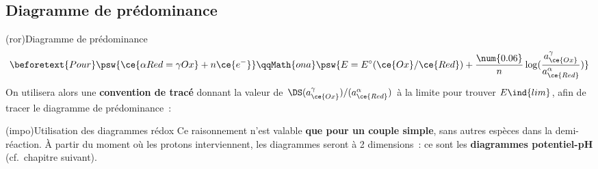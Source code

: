 \documentclass[../../main/main.tex]{subfiles}
\begin{document}
\subsection{Diagramme de prédominance}
\begin{tcb*}(ror){Diagramme de prédominance}
	\vspace{-10pt}
	\begin{gather*}
		\beforetext{Pour}
		\psw{
			\ce{\alpha Red = \gamma Ox} + n\ce{e^-}
		}
		\qqMath{on a}
		\psw{
			E = E^\circ(\ce{Ox}/\ce{Red}) + \frac{\num{0.06}}{n} \log
			(\frac{a_{\ce{Ox}}^{\gamma}}{a_{\ce{Red}}^{\alpha}})
		}
	\end{gather*}
	On utilisera alors une \textbf{convention de tracé} donnant la valeur de
	$\DS (a_{\ce{Ox}}^{\gamma})/(a_{\ce{Red}}^{\alpha})$ à la limite pour
	trouver $E\ind{lim}$, afin de tracer le diagramme de prédominance~:
	\vspace{-15pt}
	\begin{center}
		\vspace{-15pt}
	\end{center}
\end{tcb*}
\begin{tcb*}(impo){Utilisation des diagrammes rédox}
	Ce raisonnement n'est valable \textbf{que pour un couple simple}, sans autres
	espèces dans la demi-réaction. À partir du moment où les protons 
	interviennent, les diagrammes seront à 2 dimensions~: ce sont les
	\textbf{diagrammes potentiel-pH} (cf.\ chapitre suivant).
\end{tcb*}
\end{document}
